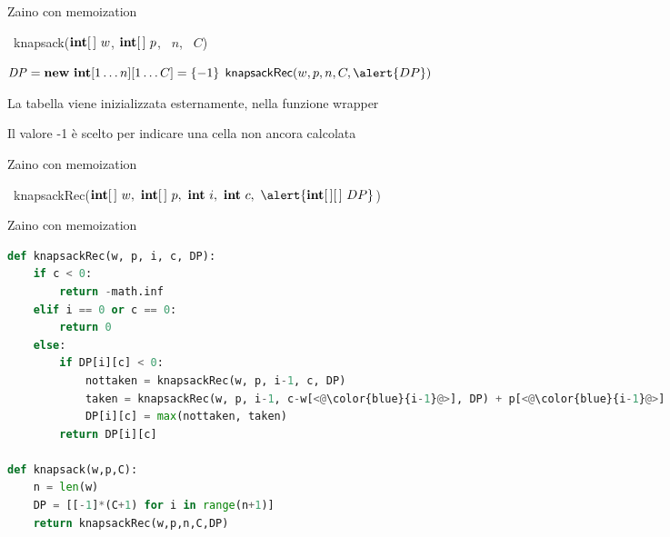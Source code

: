 \begin{frame}{Zaino con memoization}

\vspace{-9pt}
\begin{Procedure}
\caption[A]{\INTEGER\ \textsf{knapsack}($\INTEGER[\,]\ w$, $\INTEGER[\,]\ p$, \INTEGER\ $n$, \INTEGER\ $C$)}
\alert{$\mathit{DP} = \NEW\ \INTEGER[1 \ldots n][1 \ldots C] = \{ -1 \}$}\;
\Return $\textsf{knapsackRec}(w, p, n, C, \alert{DP})$
\end{Procedure}

\BIL
\item La tabella viene inizializzata esternamente, nella funzione wrapper
\item Il valore -1 è scelto per indicare una cella non ancora calcolata
\EIL

\end{frame}

\begin{frame}{Zaino con memoization}

\vspace{-9pt}
\begin{Procedure}
\caption[A]{\INTEGER\ \textsf{knapsackRec}($\INTARRAY\ w,\ \INTARRAY\ p,\  \INTEGER\ i,\ \INTEGER\ c,\ \alert{\INTARRAY[\,]\ DP}$)}

\end{Procedure}

\end{frame}



\begin{frame}[fragile,shrink=5]{Zaino con memoization}

\vspace{-18pt}
\begin{lstlisting}[language=python,tabsize=2]
def knapsackRec(w, p, i, c, DP):
	if c < 0:
		return -math.inf
	elif i == 0 or c == 0:
		return 0
	else:
		if DP[i][c] < 0:
			nottaken = knapsackRec(w, p, i-1, c, DP)
			taken = knapsackRec(w, p, i-1, c-w[<@\color{blue}{i-1}@>], DP) + p[<@\color{blue}{i-1}@>]
			DP[i][c] = max(nottaken, taken)
		return DP[i][c]

def knapsack(w,p,C):
	n = len(w)
	DP = [[-1]*(C+1) for i in range(n+1)]
	return knapsackRec(w,p,n,C,DP)
\end{lstlisting}

\end{frame}

